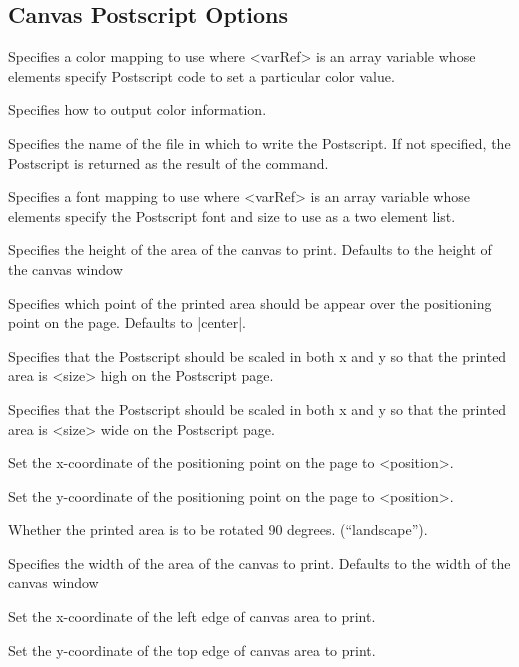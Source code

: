 
\subsection*{Canvas Postscript Options}
\begin{enum}{1cm}

Specifies a color mapping to use where <varRef> is an  array  variable
whose elements  specify Postscript  code to set a particular color value.

Specifies how to output color  information.

Specifies the name of the file in which  to  write the  Postscript.
If not specified, the Postscript is returned as the result of the command.

Specifies a font mapping to use where <varRef> is an  array  variable
whose elements  specify the Postscript font and size to use as a two element list.

Specifies the height of the area of the canvas to print.  Defaults to
the height of the canvas window

Specifies which point of the printed  area  should be  appear  over the 
positioning point on the page. Defaults to |center|.

Specifies that the Postscript should be scaled in both x and y so that
the printed area is <size> high on the Postscript page.

Specifies that the Postscript should be scaled in both x and y so that
the printed area is <size> wide on the Postscript page.

Set the x-coordinate of the positioning point on the page to <position>.

Set the y-coordinate of the positioning point on the page to <position>.

Whether the printed area is to be rotated 90 degrees. (``landscape'').

Specifies the width of the area of the canvas to print.  Defaults to
the width of the canvas window

Set the x-coordinate of the left edge of canvas area to print.

Set the y-coordinate of the top edge of canvas area to print.

\end{enum}

